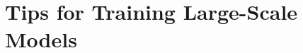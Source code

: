\documentclass[\toplevelprefix/book-main.tex]{subfiles}
\begin{document}
\section{Tips for Training Large-Scale Models}\label{sec:training_tips}




\end{document}
